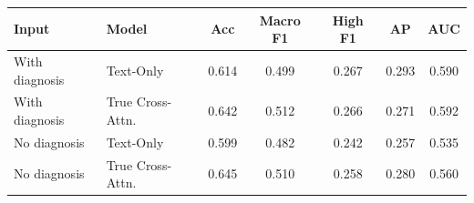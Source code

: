 \begin{tabular}{llccccc}
\toprule
Input & Model & Acc & Macro F1 & High F1 & AP & AUC \\
\midrule
With diagnosis & Text-Only & 0.614 & 0.499 & 0.267 & 0.293 & 0.590 \\
With diagnosis & True Cross-Attn. & 0.642 & 0.512 & 0.266 & 0.271 & 0.592 \\
\midrule
No diagnosis & Text-Only & 0.599 & 0.482 & 0.242 & 0.257 & 0.535 \\
No diagnosis & True Cross-Attn. & 0.645 & 0.510 & 0.258 & 0.280 & 0.560 \\
\bottomrule
\end{tabular}
